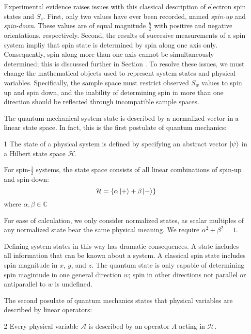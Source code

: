 Experimental evidence raises issues with this classical description of electron spin states and $S_z$. First, only two values have ever been recorded, named \textit{spin-up} and \textit{spin-down}. These values are of equal magnitude $\frac{\hbar}{2}$ with positive and negative orientations, respectively. Second, the results of succesive measurements of a spin system impliy that spin state is determined by spin along one axis only. Consequently, spin along more than one axis cannot be simultaneously determined; this is discussed further in Section . To resolve these issues, we must change the mathematical objects used to represent system states and physical variables. Specifically, the sample space must restrict observed $S_w$ values to spin up and spin down, and the inability of determining spin in more than one direction should be reflected through incompatible sample spaces.

The quantum mechanical system state is described by a normalized vector in a linear state space. In fact, this is the first postulate of quantum mechanics:
\begin{Thm:Postulate}{1}
    The state of a physical system is defined by specifying an abstract vector $\ket{\psi}$ in a Hilbert state space $\mathcal{H}$.
\end{Thm:Postulate}

For spin-$\frac{1}{2}$ systems, the state space consists of all linear combinations of spin-up and spin-down:
\begin{equation}
    \mathcal{H} = \{\alpha\ket{+} + \beta\ket{-}\}
\end{equation}
where $\alpha, \beta \in \mathbb{C}$

For ease of calculation, we only consider normalized states, as scalar multiples of any normalized state bear the same physical meaning. We require $\alpha^2 + \beta^2 = 1$.

Defining system states in this way has dramatic consequences. A state includes all information that can be known about a system. A classical spin state includes spin magnitude in $x$, $y$, and $z$. The quantum state is only capable of determining spin magintude in one general direction $w$; spin in other directions not parallel or antiparallel to $w$ is undefined.

The second posulate of quantum mechanics states that physical variables are described by linear operators:
\begin{Thm:Postulate}{2}
    Every physical variable $\mathcal{A}$ is described by an operator $A$ acting in $\mathcal{H}$.
\end{Thm:Postulate}

